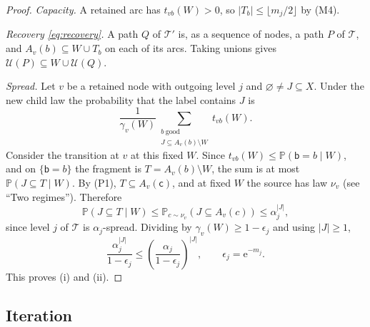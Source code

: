 \documentclass[11pt]{article}
\numberwithin{equation}{section}
\newcommand{\PP}{\mathbb P}
\newcommand{\TT}{\mathcal T}
\newcommand{\UU}{\mathcal U}
\newcommand{\ee}{\mathrm e}
\newcommand{\src}{\mathsf c}
\newcommand{\tgt}{\mathsf b}
\begin{document}
\begin{proof}
\emph{Capacity.} A retained arc has $t_{vb}(W)>0$, so
$|T_b|\le\lfloor m_j/2\rfloor$ by (M4).

\emph{Recovery \eqref{eq:recovery}.} A path $Q$ of $\TT'$ is, as a
sequence of nodes, a path $P$ of $\TT$, and
$A_v(b)\subseteq W\cup T_b$ on each of its arcs. Taking unions gives
$\UU(P)\subseteq W\cup\UU(Q)$.

\emph{Spread.} Let $v$ be a retained node with outgoing level $j$ and
$\varnothing\ne J\subseteq X$. Under the new child law the probability
that the label contains $J$ is
\[
 \frac1{\gamma_v(W)}
 \sum_{\substack{b\ \mathrm{good}\\ J\subseteq A_v(b)\setminus W}}
 t_{vb}(W).
\]
Consider the transition at $v$ at this fixed $W$. Since
$t_{vb}(W)\le\PP(\tgt=b\mid W)$, and on $\{\tgt=b\}$ the fragment is
$T=A_v(b)\setminus W$, the sum is at most $\PP(J\subseteq T\mid W)$. By
(P1), $T\subseteq A_v(\src)$, and at fixed $W$ the source has law
$\nu_v$ (see ``Two regimes''). Therefore
\[
 \PP(J\subseteq T\mid W)\le\PP_{c\sim\nu_v}(J\subseteq A_v(c))
 \le\alpha_j^{|J|},
\]
since level $j$ of $\TT$ is $\alpha_j$-spread. Dividing by
$\gamma_v(W)\ge1-\epsilon_j$ and using $|J|\ge1$,
\[
 \frac{\alpha_j^{|J|}}{1-\epsilon_j}
 \le\left(\frac{\alpha_j}{1-\epsilon_j}\right)^{|J|},
 \qquad \epsilon_j=\ee^{-m_j}.
\]
This proves (i) and (ii).
\end{proof}

\subsection{Iteration}
\end{document}
